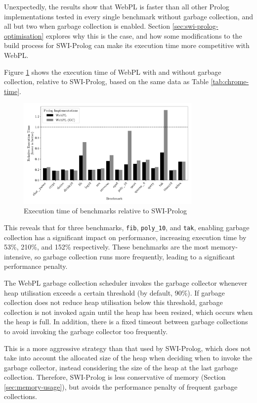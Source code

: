 Unexpectedly, the results show that WebPL is faster than all other Prolog implementations tested in every single benchmark without garbage collection, and all but two when garbage collection is enabled. Section \ref{sec:swi-prolog-optimisation} explores why this is the case, and how some modifications to the build process for SWI-Prolog can make its execution time more competitive with WebPL.

Figure \ref{fig:relative-performance} shows the execution time of WebPL with and without garbage collection, relative to SWI-Prolog, based on the same data as Table \ref{tab:chrome-time}.

\begin{figure}[H]
\centering
\includegraphics[width=0.8\textwidth]{relative_performance.pdf}
\caption{Execution time of benchmarks relative to SWI-Prolog}
\label{fig:relative-performance}
\end{figure}

This reveals that for three benchmarks, \texttt{fib}, \texttt{poly\_10}, and \texttt{tak}, enabling garbage collection has a significant impact on performance, increasing execution time by 53\%, 210\%, and 152\% respectively. These benchmarks are the most memory-intensive, so garbage collection runs more frequently, leading to a significant performance penalty.

The WebPL garbage collection scheduler invokes the garbage collector whenever heap utilisation exceeds a certain threshold (by default, 90\%). If garbage collection does not reduce heap utilisation below this threshold, garbage collection is not invoked again until the heap has been resized, which occurs when the heap is full. In addition, there is a fixed timeout between garbage collections to avoid invoking the garbage collector too frequently.

This is a more aggressive strategy than that used by SWI-Prolog, which does not take into account the allocated size of the heap when deciding when to invoke the garbage collector, instead considering the size of the heap at the last garbage collection. Therefore, SWI-Prolog is less conservative of memory (Section \ref{sec:memory-usage}), but avoids the performance penalty of frequent garbage collections.

